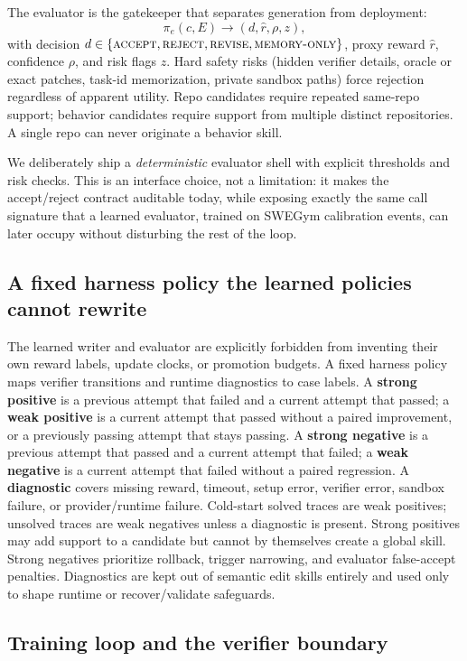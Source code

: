 The evaluator is the gatekeeper that separates generation from deployment:
\[
\pi_e(c, E) \rightarrow (d, \hat r, \rho, z),
\]
with decision $d \in \{\textsc{accept}, \textsc{reject}, \textsc{revise},
\textsc{memory-only}\}$, proxy reward $\hat r$, confidence $\rho$, and risk flags
$z$. Hard safety risks (hidden verifier details, oracle or exact patches,
task-id memorization, private sandbox paths) force rejection regardless of
apparent utility. Repo candidates require repeated same-repo support; behavior
candidates require support from multiple distinct repositories. A single repo can
never originate a behavior skill.

We deliberately ship a \emph{deterministic} evaluator shell with explicit
thresholds and risk checks. This is an interface choice, not a limitation: it
makes the accept/reject contract auditable today, while exposing exactly the same
call signature that a learned evaluator, trained on SWEGym calibration
events, can later occupy without disturbing the rest of the loop.

\subsection{A fixed harness policy the learned policies cannot rewrite}

The learned writer and evaluator are explicitly forbidden from inventing their
own reward labels, update clocks, or promotion budgets. A fixed harness policy
maps verifier transitions and runtime diagnostics to case labels. A
\textbf{strong positive} is a previous attempt that failed and a current
attempt that passed; a \textbf{weak positive} is a current attempt that passed
without a paired improvement, or a previously passing attempt that stays
passing. A \textbf{strong negative} is a previous attempt that passed and a
current attempt that failed; a \textbf{weak negative} is a current attempt that
failed without a paired regression. A \textbf{diagnostic} covers missing reward,
timeout, setup error, verifier error, sandbox failure, or provider/runtime
failure. Cold-start solved traces are weak positives; unsolved traces are weak
negatives unless a diagnostic is present. Strong positives may add support to a
candidate but cannot by themselves create a global skill. Strong negatives
prioritize rollback, trigger narrowing, and evaluator false-accept penalties.
Diagnostics are kept out of semantic edit skills entirely and used only to
shape runtime or recover/validate safeguards.

\subsection{Training loop and the verifier boundary}

